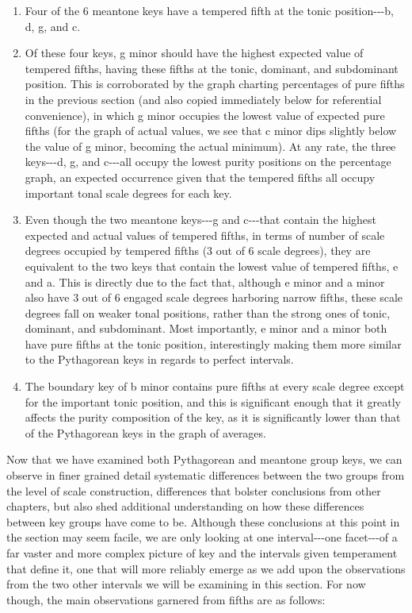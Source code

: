 \begin{enumerate}
\def\labelenumi{\arabic{enumi}.}
\tightlist
\item
  Four of the 6 meantone keys have a tempered fifth at the tonic
  position-\/-\/-b, d, g, and c.
\item
  Of these four keys, g minor should have the highest expected value of
  tempered fifths, having these fifths at the tonic, dominant, and
  subdominant position. This is corroborated by the graph charting
  percentages of pure fifths in the previous section (and also copied
  immediately below for referential convenience), in which g minor
  occupies the lowest value of expected pure fifths (for the graph of
  actual values, we see that c minor dips slightly below the value of g
  minor, becoming the actual minimum). At any rate, the three
  keys-\/-\/-d, g, and c-\/-\/-all occupy the lowest purity positions on
  the percentage graph, an expected occurrence given that the tempered
  fifths all occupy important tonal scale degrees for each key.
\item
  Even though the two meantone keys-\/-\/-g and c-\/-\/-that contain the
  highest expected and actual values of tempered fifths, in terms of
  number of scale degrees occupied by tempered fifths (3 out of 6 scale
  degrees), they are equivalent to the two keys that contain the lowest
  value of tempered fifths, e and a. This is directly due to the fact
  that, although e minor and a minor also have 3 out of 6 engaged scale
  degrees harboring narrow fifths, these scale degrees fall on weaker
  tonal positions, rather than the strong ones of tonic, dominant, and
  subdominant. Most importantly, e minor and a minor both have pure
  fifths at the tonic position, interestingly making them more similar
  to the Pythagorean keys in regards to perfect intervals.
\item
  The boundary key of b minor contains pure fifths at every scale degree
  except for the important tonic position, and this is significant
  enough that it greatly affects the purity composition of the key, as
  it is significantly lower than that of the Pythagorean keys in the
  graph of averages.
\end{enumerate}


    \begin{center}
    \end{center}
    
    Now that we have examined both Pythagorean and meantone group keys, we
can observe in finer grained detail systematic differences between the
two groups from the level of scale construction, differences that
bolster conclusions from other chapters, but also shed additional
understanding on how these differences between key groups have come to
be. Although these conclusions at this point in the section may seem
facile, we are only looking at one interval-\/-\/-one facet-\/-\/-of a
far vaster and more complex picture of key and the intervals given
temperament that define it, one that will more reliably emerge as we add
upon the observations from the two other intervals we will be examining
in this section. For now though, the main observations garnered from
fifths are as follows:


